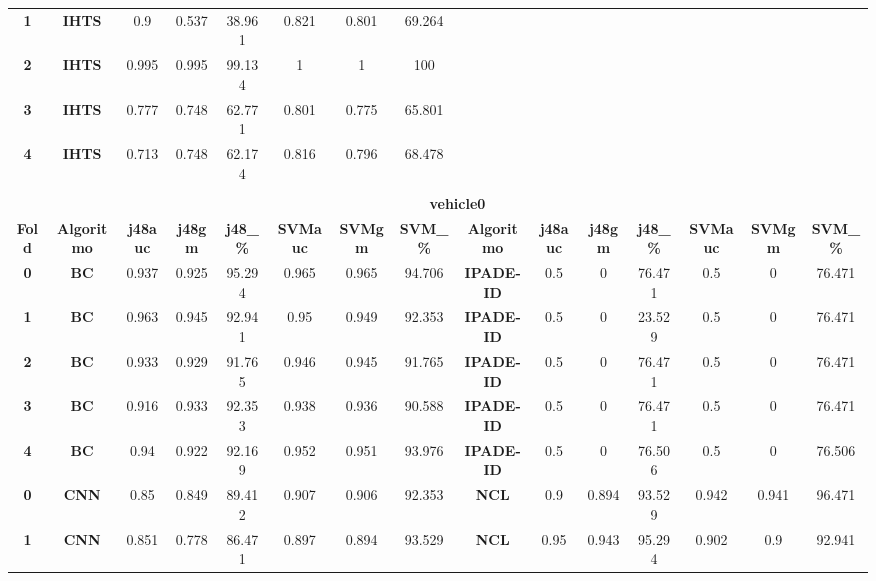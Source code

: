 {{\begin{tabular}{c|c|cccccc|ccccccc}
\textbf{1} & \textbf{IHTS} & 0.9   & 0.537 & 38.961 & 0.821 & 0.801 & 69.264 &       &       &       &       &       &       &  \\
\textbf{2} & \textbf{IHTS} & 0.995 & 0.995 & 99.134 & 1     & 1     & 100   &       &       &       &       &       &       &  \\
\textbf{3} & \textbf{IHTS} & 0.777 & 0.748 & 62.771 & 0.801 & 0.775 & 65.801 &       &       &       &       &       &       &  \\
\textbf{4} & \textbf{IHTS} & 0.713 & 0.748 & 62.174 & 0.816 & 0.796 & 68.478 &       &       &       &       &       &       &  \\
\multicolumn{1}{c}{} & \multicolumn{1}{c}{} &       &       &       &       &       & \multicolumn{1}{c}{} &       &       &       &       &       &       &  \\
\multicolumn{1}{c}{} & \multicolumn{14}{c}{\textbf{vehicle0}} \\
\midrule
\textbf{Fold} & \textbf{Algoritmo} & \textbf{j48auc} & \textbf{j48gm} & \textbf{j48\_\%} & \textbf{SVMauc} & \textbf{SVMgm} & \textbf{SVM\_\%} & \multicolumn{1}{c|}{\textbf{Algoritmo}} & \textbf{j48auc} & \textbf{j48gm} & \textbf{j48\_\%} & \textbf{SVMauc} & \textbf{SVMgm} & \textbf{SVM\_\%} \\
\midrule
\textbf{0} & \textbf{BC} & 0.937 & 0.925 & 95.294 & 0.965 & 0.965 & 94.706 & \multicolumn{1}{c|}{\textbf{IPADE-ID}} & 0.5   & 0     & 76.471 & 0.5   & 0     & 76.471 \\
\textbf{1} & \textbf{BC} & 0.963 & 0.945 & 92.941 & 0.95  & 0.949 & 92.353 & \multicolumn{1}{c|}{\textbf{IPADE-ID}} & 0.5   & 0     & 23.529 & 0.5   & 0     & 76.471 \\
\textbf{2} & \textbf{BC} & 0.933 & 0.929 & 91.765 & 0.946 & 0.945 & 91.765 & \multicolumn{1}{c|}{\textbf{IPADE-ID}} & 0.5   & 0     & 76.471 & 0.5   & 0     & 76.471 \\
\textbf{3} & \textbf{BC} & 0.916 & 0.933 & 92.353 & 0.938 & 0.936 & 90.588 & \multicolumn{1}{c|}{\textbf{IPADE-ID}} & 0.5   & 0     & 76.471 & 0.5   & 0     & 76.471 \\
\textbf{4} & \textbf{BC} & 0.94  & 0.922 & 92.169 & 0.952 & 0.951 & 93.976 & \multicolumn{1}{c|}{\textbf{IPADE-ID}} & 0.5   & 0     & 76.506 & 0.5   & 0     & 76.506 \\
\textbf{0} & \textbf{CNN} & 0.85  & 0.849 & 89.412 & 0.907 & 0.906 & 92.353 & \multicolumn{1}{c|}{\textbf{NCL}} & 0.9   & 0.894 & 93.529 & 0.942 & 0.941 & 96.471 \\
\textbf{1} & \textbf{CNN} & 0.851 & 0.778 & 86.471 & 0.897 & 0.894 & 93.529 & \multicolumn{1}{c|}{\textbf{NCL}} & 0.95  & 0.943 & 95.294 & 0.902 & 0.9   & 92.941 \\

\end{tabular}}}
